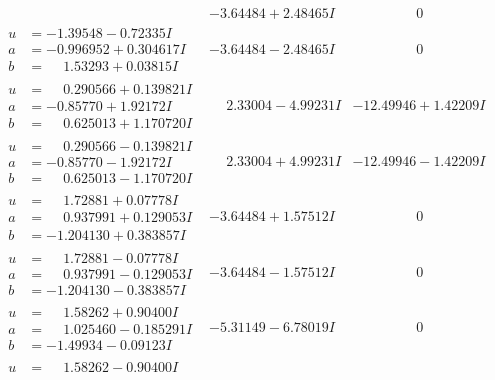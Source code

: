 \documentclass[1p]{elsarticle_modified}
\theoremstyle{definition}
\begin{document}
$$\begin{array}{c|c|c}
 & -3.64484 + 2.48465 I & \phantom{-0.000000 } 0 \\ \hline\begin{aligned}
u &= -1.39548 - 0.72335 I \\
a &= -0.996952 + 0.304617 I \\
b &= \phantom{-}1.53293 + 0.03815 I\end{aligned}
 & -3.64484 - 2.48465 I & \phantom{-0.000000 } 0 \\ \hline\begin{aligned}
u &= \phantom{-}0.290566 + 0.139821 I \\
a &= -0.85770 + 1.92172 I \\
b &= \phantom{-}0.625013 + 1.170720 I\end{aligned}
 & \phantom{-}2.33004 - 4.99231 I & -12.49946 + 1.42209 I \\ \hline\begin{aligned}
u &= \phantom{-}0.290566 - 0.139821 I \\
a &= -0.85770 - 1.92172 I \\
b &= \phantom{-}0.625013 - 1.170720 I\end{aligned}
 & \phantom{-}2.33004 + 4.99231 I & -12.49946 - 1.42209 I \\ \hline\begin{aligned}
u &= \phantom{-}1.72881 + 0.07778 I \\
a &= \phantom{-}0.937991 + 0.129053 I \\
b &= -1.204130 + 0.383857 I\end{aligned}
 & -3.64484 + 1.57512 I & \phantom{-0.000000 } 0 \\ \hline\begin{aligned}
u &= \phantom{-}1.72881 - 0.07778 I \\
a &= \phantom{-}0.937991 - 0.129053 I \\
b &= -1.204130 - 0.383857 I\end{aligned}
 & -3.64484 - 1.57512 I & \phantom{-0.000000 } 0 \\ \hline\begin{aligned}
u &= \phantom{-}1.58262 + 0.90400 I \\
a &= \phantom{-}1.025460 - 0.185291 I \\
b &= -1.49934 - 0.09123 I\end{aligned}
 & -5.31149 - 6.78019 I & \phantom{-0.000000 } 0 \\ \hline\begin{aligned}
u &= \phantom{-}1.58262 - 0.90400 I \\

\end{aligned}
\end{array}$$
\end{document}
